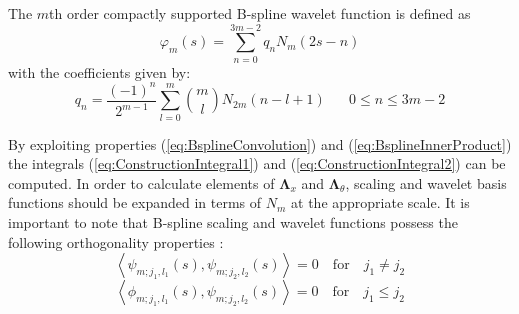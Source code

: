 \documentclass[journal,a4paper]{IEEEtran}
\begin{document}
The $m$th order compactly supported B-spline wavelet function is defined as \cite{Chui1992} 
\begin{equation}
 \varphi_{m}\left(s\right)=\sum_{n=0}^{3m-2} q_n N_{m}\left(2s-n\right)
\end{equation}
with the coefficients given by:\\ 
\begin{equation}
 q_n= \frac{\left(-1\right)^n}{2^{m-1}} \sum_{l=0}^{m} \binom{m}{l} N_{2m}\left(n-l+1\right) \quad \text{ $0\le n\le 3m-2$}
\end{equation}


By exploiting properties (\ref{eq:BsplineConvolution}) and (\ref{eq:BsplineInnerProduct}) the  integrals (\ref{eq:ConstructionIntegral1}) and (\ref{eq:ConstructionIntegral2}) can be computed. In order to calculate elements of $\boldsymbol\Lambda_{x}$ and $\boldsymbol\Lambda_{\theta}$, scaling and wavelet basis functions should be expanded  in terms of $N_m$ at the appropriate scale. It is important to note that B-spline scaling and wavelet functions possess the following orthogonality properties \cite{Unser1993}: 
\begin{equation}
 \left\langle \psi_{m;j_1,l_1}(s),\psi_{m;j_2,l_2}(s)\right\rangle =0  \quad \mathrm{for} \quad j_1\neq j_2
\label{PsiPsiOrthogonality}
\end{equation}
\begin{equation}
 \left\langle \phi_{m;j_1,l_1}(s),\psi_{m;j_2,l_2}(s)\right\rangle =0  \quad \mathrm{for} \quad j_1\leq j_2
\label{PhiPsiOrthogonality}
\end{equation}
\end{document}
